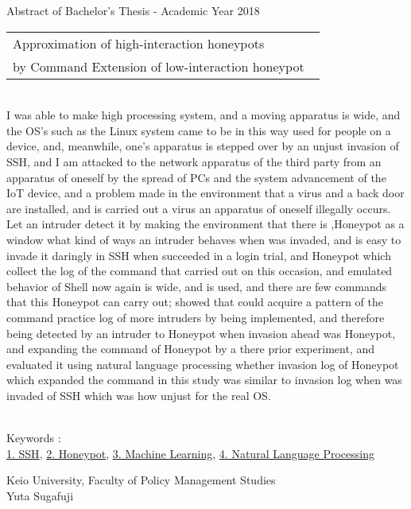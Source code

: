 Abstract of Bachelor's Thesis - Academic Year 2018
\begin{center}
\begin{large}
\begin{tabular}{|p{0.97\linewidth}|}
    \hline
        Approximation of high-interaction honeypots\\
by Command Extension of low-interaction honeypot\\
    \hline
\end{tabular}
\end{large}
\end{center}

~ \\
\renewcommand{\baselinestretch}{0.9}
I was able to make high processing system, and a moving apparatus is wide, and the OS's such as the Linux system came to be in this way used for people on a device, and, meanwhile, one's apparatus is stepped over by an unjust invasion of SSH, and I am attacked to the network apparatus of the third party from an apparatus of oneself by the spread of PCs and the system advancement of the IoT device, and a problem made in the environment that a virus and a back door are installed, and is carried out a virus an apparatus of oneself illegally occurs.
Let an intruder detect it by making the environment that there is ,Honeypot as a window what kind of ways an intruder behaves when was invaded, and is easy to invade it daringly in SSH when succeeded in a login trial, and Honeypot which collect the log of the command that carried out on this occasion, and emulated behavior of Shell now again is wide, and is used, and there are few commands that this Honeypot can carry out; showed that could acquire a pattern of the command practice log of more intruders by being implemented, and therefore being detected by an intruder to Honeypot when invasion ahead was Honeypot, and expanding the command of Honeypot by a there prior experiment, and evaluated it using natural language processing whether invasion log of Honeypot which expanded the command in this study was similar to invasion log when was invaded of SSH which was how unjust for the real OS.
\renewcommand{\baselinestretch}{1.0}

~ \\
Keywords : \\
\underline{1. SSH},
\underline{2. Honeypot},
\underline{3. Machine Learning},
\underline{4. Natural Language Processing}
\begin{flushright}
Keio University, Faculty of Policy Management Studies\\
Yuta Sugafuji
\end{flushright}
